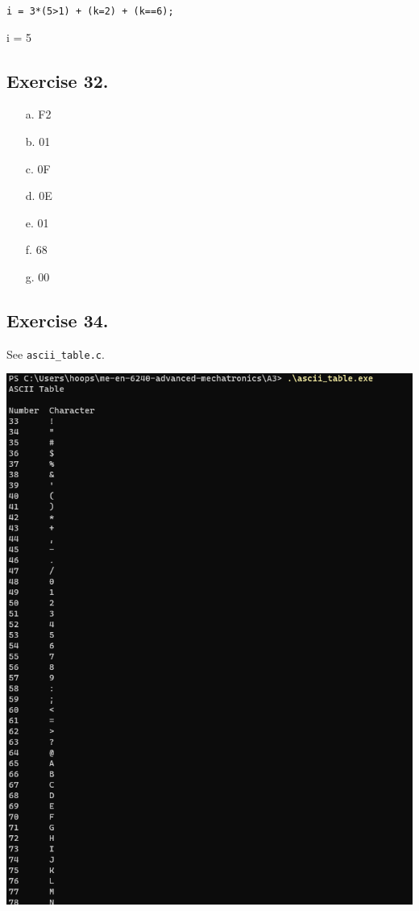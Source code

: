 \documentclass[12pt]{article}
\begin{document}
\noindent
\verb|i = 3*(5>1) + (k=2) + (k==6);|

\noindent
i = 5

\subsection*{Exercise 32.}
\begin{itemize}
    \item[a.]
    F2

    \item[b.]
    01

    \item[c.]  
    0F

    \item[d.]
    0E

    \item[e.]
    01

    \item[f.]
    68

    \item[g.]
    00
\end{itemize}

\subsection*{Exercise 34.}
See \verb|ascii_table.c|.

\vspace{.1in}
\begin{center}
    \includegraphics{ascii_table_img.png}
\end{center}
\end{document}
